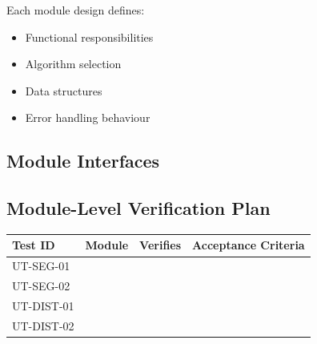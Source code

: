 \documentclass[11pt,a4paper]{article}
\begin{document}
Each module design defines:

\begin{itemize}
    \item Functional responsibilities
    \item Algorithm selection
    \item Data structures
    \item Error handling behaviour
\end{itemize}

\subsection{Module Interfaces}

\subsection{Module-Level Verification Plan}

\begin{table}[H]
\centering
\renewcommand{\arraystretch}{1.2}
\begin{tabular}{@{}p{2.5cm}p{3cm}p{4cm}p{3cm}@{}}
\toprule
\textbf{Test ID} & \textbf{Module} & \textbf{Verifies} & \textbf{Acceptance Criteria} \\
\midrule
UT-SEG-01 &  &  &  \\
UT-SEG-02 &  &  &  \\
UT-DIST-01 &  &  &  \\
UT-DIST-02 &  &  &  \\
\bottomrule
\end{tabular}
\end{table}
\end{document}
